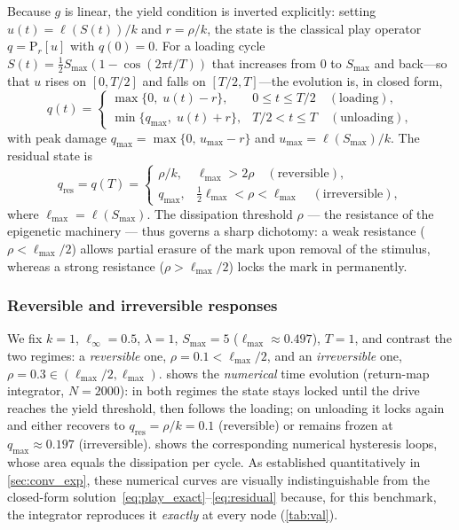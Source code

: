 Because $g$ is linear, the yield condition is inverted explicitly:
setting $u(t)=\ell(S(t))/k$ and $r=\rho/k$, the state is the classical
play operator $q=\mathrm{P}_r[u]$ with $q(0)=0$. For a loading cycle
$S(t)=\tfrac12 S_{\max}(1-\cos(2\pi t/T))$ that increases from $0$ to
$S_{\max}$ and back---so that $u$ rises on $[0,T/2]$ and falls on
$[T/2,T]$---the evolution is, in closed form,
\begin{equation}\label{eq:play_exact}
  q(t)=
  \begin{cases}
    \max\{0,\;u(t)-r\}, & 0\le t\le T/2 \quad(\text{loading}),\\[4pt]
    \min\{q_{\max},\;u(t)+r\}, & T/2< t\le T \quad(\text{unloading}),
  \end{cases}
\end{equation}
with peak damage $q_{\max}=\max\{0,\,u_{\max}-r\}$ and
$u_{\max}=\ell(S_{\max})/k$. The residual state is
\begin{equation}\label{eq:residual}
  q_{\mathrm{res}}=q(T)=
  \begin{cases}
    \rho/k, & \ell_{\max}>2\rho \quad(\text{reversible}),\\[2pt]
    q_{\max}, & \tfrac12\ell_{\max}<\rho<\ell_{\max} \quad(\text{irreversible}),
  \end{cases}
\end{equation}
where $\ell_{\max}=\ell(S_{\max})$. The dissipation threshold $\rho$ ---
the resistance of the epigenetic machinery --- thus governs a sharp
dichotomy: a weak resistance ($\rho<\ell_{\max}/2$) allows partial
erasure of the mark upon removal of the stimulus, whereas a strong
resistance ($\rho>\ell_{\max}/2$) locks the mark in permanently.

\subsubsection{Reversible and irreversible responses}\label{sec:regimes}

We fix $k=1$, $\ell_\infty=0.5$, $\lambda=1$, $S_{\max}=5$
($\ell_{\max}\approx0.497$), $T=1$, and contrast the two regimes:
a \emph{reversible} one, $\rho=0.1<\ell_{\max}/2$, and an
\emph{irreversible} one, $\rho=0.3\in(\ell_{\max}/2,\ell_{\max})$.
 shows the \emph{numerical} time evolution (return-map
integrator, $N=2000$): in both regimes the state stays locked until the
drive reaches the yield threshold, then follows the loading; on
unloading it locks again and either recovers to
$q_{\mathrm{res}}=\rho/k=0.1$ (reversible) or remains frozen at
$q_{\max}\approx0.197$ (irreversible).  shows the
corresponding numerical hysteresis loops, whose area equals the
dissipation per cycle. As established quantitatively in
\cref{sec:conv_exp}, these numerical curves are visually
indistinguishable from the closed-form
solution~\eqref{eq:play_exact}--\eqref{eq:residual} because, for this
benchmark, the integrator reproduces it \emph{exactly} at every node
(\cref{tab:val}).

